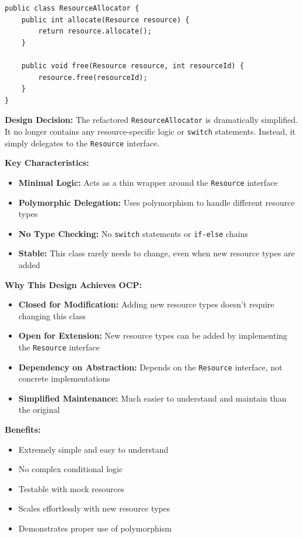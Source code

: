 \begin{verbatim}
public class ResourceAllocator {
    public int allocate(Resource resource) {
        return resource.allocate();
    }
    
    public void free(Resource resource, int resourceId) {
        resource.free(resourceId);
    }
}
\end{verbatim}

\textbf{Design Decision:} The refactored \texttt{ResourceAllocator} is dramatically simplified. It no longer contains any resource-specific logic or \texttt{switch} statements. Instead, it simply delegates to the \texttt{Resource} interface.

\textbf{Key Characteristics:}
\begin{itemize}
    \item \textbf{Minimal Logic:} Acts as a thin wrapper around the \texttt{Resource} interface
    \item \textbf{Polymorphic Delegation:} Uses polymorphism to handle different resource types
    \item \textbf{No Type Checking:} No \texttt{switch} statements or \texttt{if-else} chains
    \item \textbf{Stable:} This class rarely needs to change, even when new resource types are added
\end{itemize}

\textbf{Why This Design Achieves OCP:}
\begin{itemize}
    \item \textbf{Closed for Modification:} Adding new resource types doesn't require changing this class
    \item \textbf{Open for Extension:} New resource types can be added by implementing the \texttt{Resource} interface
    \item \textbf{Dependency on Abstraction:} Depends on the \texttt{Resource} interface, not concrete implementations
    \item \textbf{Simplified Maintenance:} Much easier to understand and maintain than the original
\end{itemize}

\textbf{Benefits:}
\begin{itemize}
    \item Extremely simple and easy to understand
    \item No complex conditional logic
    \item Testable with mock resources
    \item Scales effortlessly with new resource types
    \item Demonstrates proper use of polymorphism
\end{itemize}

